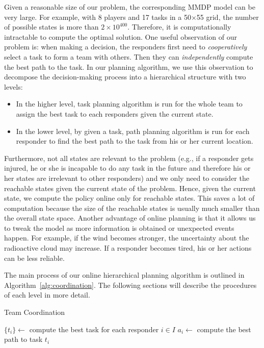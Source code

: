 \noindent Given a reasonable size of our problem, the corresponding
MMDP model can be very large. For example, with 8 players and 17
tasks in a 50$\times$55 grid, the number of possible states is more
than $2\times 10^{400}$. Therefore, it is computationally
intractable to compute the optimal solution. One useful observation
of our problem is: when making a decision, the responders first
need to {\em cooperatively} select a task to form a team with
others. Then they can {\em independently} compute the best path to
the task. In our planning algorithm, we use this observation to
decompose the decision-making process into a hierarchical structure
with two levels:
\begin{itemize}
  \item In the higher level, task planning algorithm is run for
      the whole team to assign the best task to each responders
      given the current state.
  \item In the lower level, by given a task, path planning
      algorithm is run for each responder to find the best path
      to the task from his or her current location.
\end{itemize}

Furthermore, not all states are relevant to the problem (e.g., if a
responder gets injured, he or she is incapable to do any task in
the future and therefore his or her states are irrelevant to other
responders) and we only need to consider the reachable states given
the current state of the problem. Hence, given the current state,
we compute the policy online only for reachable states. This saves
a lot of computation because the size of the reachable states is
usually much smaller than the overall state space. Another
advantage of online planning is that it allows us to tweak the
model as more information is obtained or unexpected events happen.
For example, if the wind becomes stronger, the uncertainty about
the radioactive cloud may increase. If a responder becomes tired,
his or her actions can be less reliable.

The main process of our online hierarchical planning algorithm is
outlined in Algorithm~\ref{alg:coordination}. The following
sections will describe the procedures of each level in more detail.

\begin{algorithm}[t]
  \caption{Team Coordination}
  $\{ t_i \} \gets$ compute the best task for each responder $i\in I$ \;
   {
    $a_i \gets$ compute the best path to task $t_i$ \;
  }
  \label{alg:coordination}
\end{algorithm}

